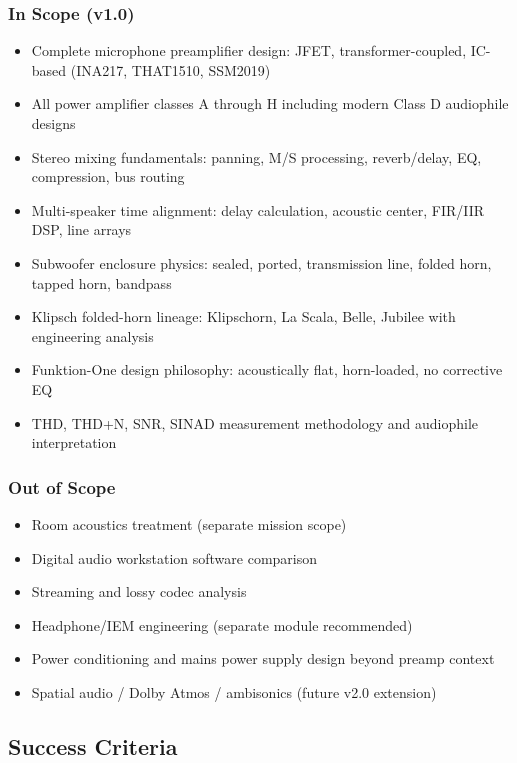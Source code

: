\documentclass[11pt,letterpaper]{article}
\begin{document}
\subsubsection{In Scope (v1.0)}
\begin{itemize}
  \item Complete microphone preamplifier design: JFET, transformer-coupled, IC-based (INA217, THAT1510, SSM2019)
  \item All power amplifier classes A through H including modern Class D audiophile designs
  \item Stereo mixing fundamentals: panning, M/S processing, reverb/delay, EQ, compression, bus routing
  \item Multi-speaker time alignment: delay calculation, acoustic center, FIR/IIR DSP, line arrays
  \item Subwoofer enclosure physics: sealed, ported, transmission line, folded horn, tapped horn, bandpass
  \item Klipsch folded-horn lineage: Klipschorn, La Scala, Belle, Jubilee with engineering analysis
  \item Funktion-One design philosophy: acoustically flat, horn-loaded, no corrective EQ
  \item THD, THD+N, SNR, SINAD measurement methodology and audiophile interpretation
\end{itemize}

\subsubsection{Out of Scope}
\begin{itemize}
  \item Room acoustics treatment (separate mission scope)
  \item Digital audio workstation software comparison
  \item Streaming and lossy codec analysis
  \item Headphone/IEM engineering (separate module recommended)
  \item Power conditioning and mains power supply design beyond preamp context
  \item Spatial audio / Dolby Atmos / ambisonics (future v2.0 extension)
\end{itemize}

\subsection{Success Criteria}
\end{document}
